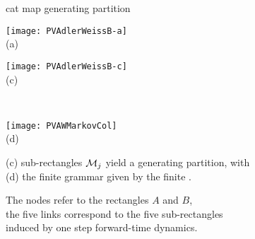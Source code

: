 \begin{frame}{cat map generating partition}
\begin{center}
            \begin{minipage}[c]{0.23\textwidth}\begin{center}
\texttt{[image: PVAdlerWeissB-a]}\\(a)
            \end{center}\end{minipage}
            \begin{minipage}[c]{0.23\textwidth}\begin{center}
\texttt{[image: PVAdlerWeissB-c]}\\(c)
            \end{center}\end{minipage}
            ~~~
            \begin{minipage}[c]{0.09\textwidth}\begin{center}
\texttt{[image: PVAWMarkovCol]}\\(d)
            \end{center}\end{minipage}
\end{center}
(c)
sub-rectangles $\mathcal{M}_j$ yield a generating partition, with
\\
(d)
the finite grammar given by the finite {\markGraph}.

\medskip

The nodes
refer to the rectangles $A$ and $B$, \\
the five links correspond to the five sub-rectangles \\
induced by one step forward-time dynamics.

\bigskip {\scriptsize \em
\hfill \textcolor{green}{this construction is new, not in literature}
         }

\end{frame}

